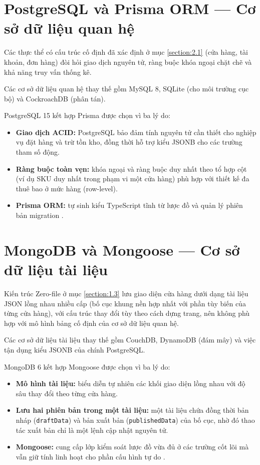 \documentclass[../main.tex]{subfiles}
\begin{document}
\section{PostgreSQL và Prisma ORM --- Cơ sở dữ liệu quan hệ}
\label{section:3.4}

Các thực thể có cấu trúc cố định đã xác định ở mục \ref{section:2.1} (cửa hàng, tài khoản, đơn hàng) đòi hỏi giao dịch nguyên tử, ràng buộc khóa ngoại chặt chẽ và khả năng truy vấn thống kê.

Các cơ sở dữ liệu quan hệ thay thế gồm MySQL 8, SQLite (cho môi trường cục bộ) và CockroachDB (phân tán).

PostgreSQL 15 kết hợp Prisma được chọn vì ba lý do:

\begin{itemize}
    \item \textbf{Giao dịch ACID:} PostgreSQL bảo đảm tính nguyên tử cần thiết cho nghiệp vụ đặt hàng và trừ tồn kho, đồng thời hỗ trợ kiểu JSONB cho các trường tham số động.
    \item \textbf{Ràng buộc toàn vẹn:} khóa ngoại và ràng buộc duy nhất theo tổ hợp cột (ví dụ SKU duy nhất trong phạm vi một cửa hàng) phù hợp với thiết kế đa thuê bao ở mức hàng (row-level).
    \item \textbf{Prisma ORM:} tự sinh kiểu TypeScript tĩnh từ lược đồ và quản lý phiên bản migration \cite{prisma_docs, postgresql_docs}.
\end{itemize}

\section{MongoDB và Mongoose --- Cơ sở dữ liệu tài liệu}
\label{section:3.5}

Kiến trúc Zero-file ở mục \ref{section:1.3} lưu giao diện cửa hàng dưới dạng tài liệu JSON lồng nhau nhiều cấp (bố cục khung nền hợp nhất với phần tùy biến của từng cửa hàng), với cấu trúc thay đổi tùy theo cách dựng trang, nên không phù hợp với mô hình bảng cố định của cơ sở dữ liệu quan hệ.

Các cơ sở dữ liệu tài liệu thay thế gồm CouchDB, DynamoDB (đám mây) và việc tận dụng kiểu JSONB của chính PostgreSQL.

MongoDB 6 kết hợp Mongoose được chọn vì ba lý do:

\begin{itemize}
    \item \textbf{Mô hình tài liệu:} biểu diễn tự nhiên các khối giao diện lồng nhau với độ sâu thay đổi theo từng cửa hàng.
    \item \textbf{Lưu hai phiên bản trong một tài liệu:} một tài liệu chứa đồng thời bản nháp (\texttt{draftData}) và bản xuất bản (\texttt{publishedData}) của bố cục, nhờ đó thao tác xuất bản chỉ là một lệnh cập nhật nguyên tử.
    \item \textbf{Mongoose:} cung cấp lớp kiểm soát lược đồ vừa đủ ở các trường cốt lõi mà vẫn giữ tính linh hoạt cho phần cấu hình tự do \cite{mongodb_docs}.
\end{itemize}
\end{document}
